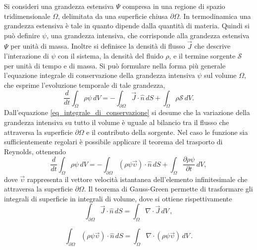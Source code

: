 Si consideri una grandezza estensiva $\Psi$ compresa in una regione di spazio 
tridimensionale $\Omega$, delimitata da una superficie chiusa $\partial \Omega$.
In termodinamica una grandezza estensiva è tale in quanto dipende dalla 
quantità 
di materia.
Quindi si può definire $\psi$, una grandezza intensiva, che corrisponde alla 
grandezza estensiva $\Psi$ per unità di massa.
Inoltre si definisce la densità di flusso $\vec{J}$ che descrive l'interazione 
di $\psi$ con il sistema, la densità del fluido $\rho$, e il termine sorgente 
$\mathcal{S}$ per unità di tempo e di massa.
Si può formulare nella forma più generale l'equazione integrale di 
conservazione 
della grandezza intensiva $\psi$ sul volume $\Omega$, che esprime l'evoluzione 
temporale di tale grandezza,
\begin{equation}
\label{eq_integrale_di_conservazione}
\frac{d}{dt}\int_{\Omega}\rho\psi \, dV = - \int_{\partial \Omega} \vec{J} 
\cdot 
\hat{n}\, dS + \int_{\Omega} \rho \mathcal{S} \, dV .
\end{equation}
Dall'equazione \eqref{eq_integrale_di_conservazione} si desume che la variazione 
della grandezza intensiva su tutto il volume è uguale al bilancio tra il flusso 
che attraversa la superficie $\partial \Omega$ e il contributo della sorgente.
Nel caso le funzione sia sufficientemente regolari è possibile applicare il 
teorema del trasporto di Reynolds, ottenendo
\begin{equation}
\label{eq_integrale_reynolds}
\frac{d}{dt}\int_{\Omega}\rho\psi \, dV = - \int_{\partial \Omega} 
(\rho\psi\vec{\upsilon}) \cdot \hat{n}\, dS + \int_{\Omega} \frac{\partial 
\rho\psi }{\partial t} \, dV ,
\end{equation}
dove $\vec{\upsilon}$ rappresenta il vettore velocità istantanea dell'elemento 
infinitesimale che attraversa la superficie $\partial \Omega$.
Il teorema di Gauss-Green permette di trasformare gli integrali di superficie 
in 
integrali di volume, dove si ottiene rispettivamente
\begin{equation}
\int_{\partial \Omega} \vec{J} \cdot \hat{n}\, dS = \int_{\Omega} \nabla \cdot 
\vec{J} \, dV \,,
\end{equation}

\begin{equation}
\label{greengauss}
\int_{\partial \Omega} (\rho\psi\vec{\upsilon}) \cdot \hat{n}\, dS = 
\int_{\Omega} \nabla \cdot (\rho\psi\vec{\upsilon})  \, dV \,.
\end{equation}

